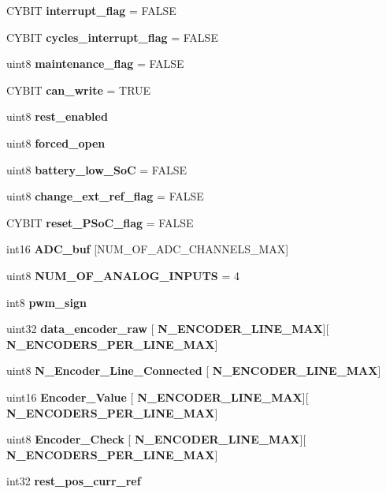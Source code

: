 \begin{DoxyCompactItemize}
C\+Y\+B\+IT \textbf{ interrupt\+\_\+flag} = F\+A\+L\+SE
\item 
C\+Y\+B\+IT \textbf{ cycles\+\_\+interrupt\+\_\+flag} = F\+A\+L\+SE
\item 
uint8 \textbf{ maintenance\+\_\+flag} = F\+A\+L\+SE
\item 
C\+Y\+B\+IT \textbf{ can\+\_\+write} = T\+R\+UE
\item 
uint8 \textbf{ rest\+\_\+enabled}
\item 
uint8 \textbf{ forced\+\_\+open}
\item 
uint8 \textbf{ battery\+\_\+low\+\_\+\+SoC} = F\+A\+L\+SE
\item 
uint8 \textbf{ change\+\_\+ext\+\_\+ref\+\_\+flag} = F\+A\+L\+SE
\item 
C\+Y\+B\+IT \textbf{ reset\+\_\+\+P\+So\+C\+\_\+flag} = F\+A\+L\+SE
\item 
\mbox{\label{globals_8c_a2fbad668712e226379890e1debdc9ff2}} 
int16 {\bfseries A\+D\+C\+\_\+buf} [N\+U\+M\+\_\+\+O\+F\+\_\+\+A\+D\+C\+\_\+\+C\+H\+A\+N\+N\+E\+L\+S\+\_\+\+M\+AX]
\item 
uint8 \textbf{ N\+U\+M\+\_\+\+O\+F\+\_\+\+A\+N\+A\+L\+O\+G\+\_\+\+I\+N\+P\+U\+TS} = 4
\item 
int8 \textbf{ pwm\+\_\+sign}
\item 
\mbox{\label{globals_8c_af1bb506bc73f01ca200da713384fefe8}} 
uint32 {\bfseries data\+\_\+encoder\+\_\+raw} [\textbf{ N\+\_\+\+E\+N\+C\+O\+D\+E\+R\+\_\+\+L\+I\+N\+E\+\_\+\+M\+AX}][\textbf{ N\+\_\+\+E\+N\+C\+O\+D\+E\+R\+S\+\_\+\+P\+E\+R\+\_\+\+L\+I\+N\+E\+\_\+\+M\+AX}]
\item 
\mbox{\label{globals_8c_ae62a59fe712aba1b45a5358ece0b3d35}} 
uint8 {\bfseries N\+\_\+\+Encoder\+\_\+\+Line\+\_\+\+Connected} [\textbf{ N\+\_\+\+E\+N\+C\+O\+D\+E\+R\+\_\+\+L\+I\+N\+E\+\_\+\+M\+AX}]
\item 
\mbox{\label{globals_8c_a7bf300fb19b8dd8db6783ef124605540}} 
uint16 {\bfseries Encoder\+\_\+\+Value} [\textbf{ N\+\_\+\+E\+N\+C\+O\+D\+E\+R\+\_\+\+L\+I\+N\+E\+\_\+\+M\+AX}][\textbf{ N\+\_\+\+E\+N\+C\+O\+D\+E\+R\+S\+\_\+\+P\+E\+R\+\_\+\+L\+I\+N\+E\+\_\+\+M\+AX}]
\item 
\mbox{\label{globals_8c_a269cff8427d6a8902a38dc258d649f06}} 
uint8 {\bfseries Encoder\+\_\+\+Check} [\textbf{ N\+\_\+\+E\+N\+C\+O\+D\+E\+R\+\_\+\+L\+I\+N\+E\+\_\+\+M\+AX}][\textbf{ N\+\_\+\+E\+N\+C\+O\+D\+E\+R\+S\+\_\+\+P\+E\+R\+\_\+\+L\+I\+N\+E\+\_\+\+M\+AX}]
\item 
int32 \textbf{ rest\+\_\+pos\+\_\+curr\+\_\+ref}
\item 

\end{DoxyCompactItemize}
